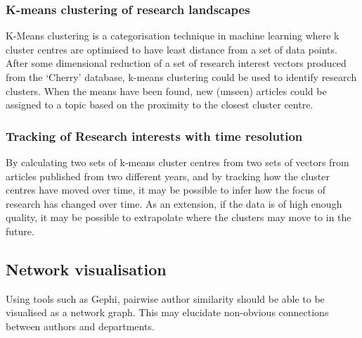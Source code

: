 \documentclass[11pt, oneside]{article}   	%
\begin{document}
\subsubsection{K-means clustering of research landscapes}
\label{sec:KMEANS}
K-Means clustering is a categorisation technique in machine learning where k cluster centres are optimised to have least distance from a set of data points. After some dimensional reduction of a set of research interest vectors produced from the `Cherry' database, k-means clustering could be used to identify research clusters. When the means have been found, new (unseen) articles could be assigned to a topic based on the proximity to the closest cluster centre. 
\subsubsection{Tracking of Research interests with time resolution}
By calculating two sets of k-means cluster centres from two sets of vectors from articles published from two different years, and by tracking how the cluster centres have moved over time, it may be possible to infer how the focus of research has changed over time. As an extension, if the data is of high enough quality, it may be possible to extrapolate where the clusters may move to in the future. 
\label{sec:TIMETRACK}
\subsection{Network visualisation}
Using tools such as Gephi, pairwise author similarity should be able to be visualised as a network graph. This may elucidate non-obvious connections between authors and departments.  
\label{sec:NETVIS}
\end{document}
